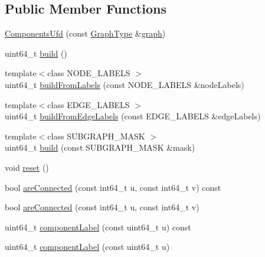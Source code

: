 \subsection*{Public Member Functions}
\begin{DoxyCompactItemize}
\item 
\hyperlink{classnifty_1_1graph_1_1ComponentsUfd_a4d31de0cf2c4eb1abadf9c2611174ead}{Components\+Ufd} (const \hyperlink{classnifty_1_1graph_1_1ComponentsUfd_a022ccf51b6dd4a943d3d614b97faa783}{Graph\+Type} \&\hyperlink{classnifty_1_1graph_1_1ComponentsUfd_a98cca33e98d6e1d9172c6fe65ceae849}{graph})
\item 
uint64\+\_\+t \hyperlink{classnifty_1_1graph_1_1ComponentsUfd_ad41a9eae9bfab1b457630b73adc1b9d3}{build} ()
\item 
{\footnotesize template$<$class N\+O\+D\+E\+\_\+\+L\+A\+B\+E\+LS $>$ }\\uint64\+\_\+t \hyperlink{classnifty_1_1graph_1_1ComponentsUfd_a1a6d02426ccb3d0f22cd7ad14abfa0b7}{build\+From\+Labels} (const N\+O\+D\+E\+\_\+\+L\+A\+B\+E\+LS \&node\+Labels)
\item 
{\footnotesize template$<$class E\+D\+G\+E\+\_\+\+L\+A\+B\+E\+LS $>$ }\\uint64\+\_\+t \hyperlink{classnifty_1_1graph_1_1ComponentsUfd_a19cff4294cf2b0ea9a96be7ad9166bc9}{build\+From\+Edge\+Labels} (const E\+D\+G\+E\+\_\+\+L\+A\+B\+E\+LS \&edge\+Labels)
\item 
{\footnotesize template$<$class S\+U\+B\+G\+R\+A\+P\+H\+\_\+\+M\+A\+SK $>$ }\\uint64\+\_\+t \hyperlink{classnifty_1_1graph_1_1ComponentsUfd_addaee74aadc18b2b3a479dca5b0851cc}{build} (const S\+U\+B\+G\+R\+A\+P\+H\+\_\+\+M\+A\+SK \&mask)
\item 
void \hyperlink{classnifty_1_1graph_1_1ComponentsUfd_af5c4c45f3de807f548f07060e4ac5ed5}{reset} ()
\item 
bool \hyperlink{classnifty_1_1graph_1_1ComponentsUfd_a37bd75263b5a1dce2d3452e5ad71062f}{are\+Connected} (const int64\+\_\+t u, const int64\+\_\+t v) const
\item 
bool \hyperlink{classnifty_1_1graph_1_1ComponentsUfd_a530d516ae63b9765ae18671da71bee9f}{are\+Connected} (const int64\+\_\+t u, const int64\+\_\+t v)
\item 
uint64\+\_\+t \hyperlink{classnifty_1_1graph_1_1ComponentsUfd_a613e0d3515c4b0aeb961ebf2afac08fa}{component\+Label} (const uint64\+\_\+t u) const
\item 
uint64\+\_\+t \hyperlink{classnifty_1_1graph_1_1ComponentsUfd_ab94489c15d132f7af184f66bf2a2dc2c}{component\+Label} (const uint64\+\_\+t u)

\end{DoxyCompactItemize}
